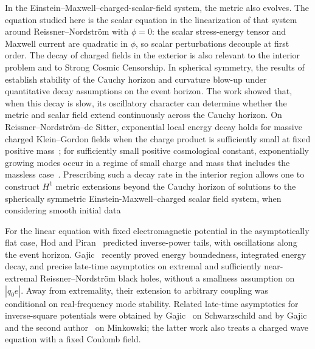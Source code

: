 \documentclass[11pt]{article}
\numberwithin{equation}{section}
\begin{document}
	In the Einstein--Maxwell--charged-scalar-field system, the metric
	also evolves. The equation studied here is the scalar equation in the
	linearization of that system around Reissner--Nordstr\"om with
	$\phi=0$: the scalar stress-energy tensor and Maxwell current are
	quadratic in $\phi$, so scalar perturbations decouple at first order.
	The decay of charged fields in the exterior is also relevant to the
	interior problem and to Strong Cosmic Censorship. In spherical
	symmetry, the results of \cite{VdM2018}  {establish stability of the Cauchy horizon and curvature blow-up under quantitative decay assumptions on the event horizon}. The work \cite{KehleVdM2024}
	showed that, when this decay is slow, its oscillatory character can
	determine whether the metric and scalar field extend continuously
	across the Cauchy horizon. {On Reissner--Nordstr\"om--de Sitter, exponential local energy decay holds for massive charged Klein--Gordon fields when the charge product is sufficiently small at fixed positive mass~\cite{Besset2020}; for sufficiently small positive cosmological constant, exponentially growing modes occur in a regime of small charge and mass that includes the massless case~\cite{BessetHafner2021}.} Prescribing such a decay rate in the interior region allows  one to construct $H^1$ metric extensions beyond the Cauchy horizon of solutions to the spherically symmetric Einstein-Maxwell--charged scalar field system, when considering smooth initial data \cite{Rossetti2025}
	
	For the linear equation with fixed electromagnetic potential in the asymptotically flat case, Hod and
	Piran~\cite{HodPiran1998} predicted inverse-power tails, with
	oscillations along the event horizon. Gajic~\cite{Gajic2026I,Gajic2026II}
	recently proved energy boundedness, integrated energy decay, and
	precise late-time asymptotics on extremal and sufficiently
	near-extremal Reissner--Nordstr\"om black holes, without a smallness assumption
	on $|q_0e|$. Away from extremality, their extension to arbitrary
	coupling was conditional on real-frequency mode stability.
	Related late-time asymptotics for
	inverse-square potentials were obtained by Gajic~\cite{GajicInverseSquare2023}
	on Schwarzschild and by Gajic and the second author~\cite{GajicVdM2024}
	on Minkowski; the latter work also treats a charged wave equation
	with a fixed Coulomb field.
	
\end{document}
